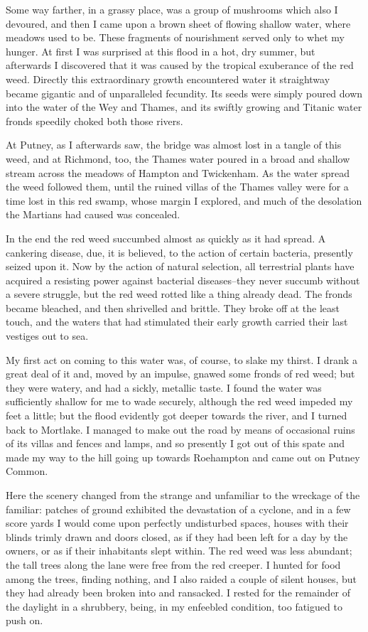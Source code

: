 Some way farther, in a grassy place, was a group of mushrooms which
also I devoured, and then I came upon a brown sheet of flowing
shallow water, where meadows used to be. These fragments of
nourishment served only to whet my hunger. At first I was surprised
at this flood in a hot, dry summer, but afterwards I discovered
that it was caused by the tropical exuberance of the red weed.
Directly this extraordinary growth encountered water it straightway
became gigantic and of unparalleled fecundity. Its seeds were
simply poured down into the water of the Wey and Thames, and its
swiftly growing and Titanic water fronds speedily choked both those
rivers.

At Putney, as I afterwards saw, the bridge was almost lost in a
tangle of this weed, and at Richmond, too, the Thames water poured
in a broad and shallow stream across the meadows of Hampton and
Twickenham. As the water spread the weed followed them, until the
ruined villas of the Thames valley were for a time lost in this red
swamp, whose margin I explored, and much of the desolation the
Martians had caused was concealed.

In the end the red weed succumbed almost as quickly as it had
spread. A cankering disease, due, it is believed, to the action of
certain bacteria, presently seized upon it. Now by the action of
natural selection, all terrestrial plants have acquired a resisting
power against bacterial diseases--they never succumb without a
severe struggle, but the red weed rotted like a thing already dead.
The fronds became bleached, and then shrivelled and brittle. They
broke off at the least touch, and the waters that had stimulated
their early growth carried their last vestiges out to sea.

My first act on coming to this water was, of course, to slake my
thirst. I drank a great deal of it and, moved by an impulse, gnawed
some fronds of red weed; but they were watery, and had a sickly,
metallic taste. I found the water was sufficiently shallow for me
to wade securely, although the red weed impeded my feet a little;
but the flood evidently got deeper towards the river, and I turned
back to Mortlake. I managed to make out the road by means of
occasional ruins of its villas and fences and lamps, and so
presently I got out of this spate and made my way to the hill going
up towards Roehampton and came out on Putney Common.

Here the scenery changed from the strange and unfamiliar to the
wreckage of the familiar: patches of ground exhibited the
devastation of a cyclone, and in a few score yards I would come
upon perfectly undisturbed spaces, houses with their blinds trimly
drawn and doors closed, as if they had been left for a day by the
owners, or as if their inhabitants slept within. The red weed was
less abundant; the tall trees along the lane were free from the red
creeper. I hunted for food among the trees, finding nothing, and I
also raided a couple of silent houses, but they had already been
broken into and ransacked. I rested for the remainder of the
daylight in a shrubbery, being, in my enfeebled condition, too
fatigued to push on.

